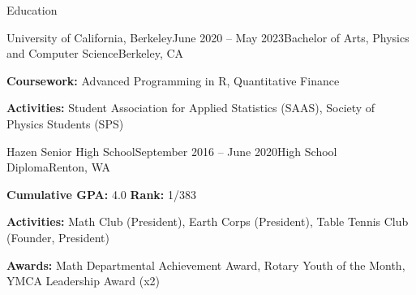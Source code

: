 \documentclass{resume} %
\begin{document}

\begin{rSection}{Education}
    \begin{rSubsection}{University of California, Berkeley}{June 2020 – May 2023}{Bachelor of Arts, Physics and Computer Science}{Berkeley, CA}
        \item {\bf Coursework:} Advanced Programming in R, Quantitative Finance
        \item {\bf Activities:} Student Association for Applied Statistics (SAAS), Society of Physics Students (SPS)
        \end{rSubsection}

    \begin{rSubsection}{Hazen Senior High School}{September 2016 – June 2020}{High School Diploma}{Renton, WA}
        \item {\bf Cumulative GPA:} 4.0 {\bf Rank:} 1/383
        \item {\bf Activities:} Math Club (President), Earth Corps (President), Table Tennis Club (Founder, President)
        \item {\bf Awards:} Math Departmental Achievement Award, Rotary Youth of the Month, YMCA Leadership Award (x2)
        \end{rSubsection}
    \end{rSection}

\end{document}
